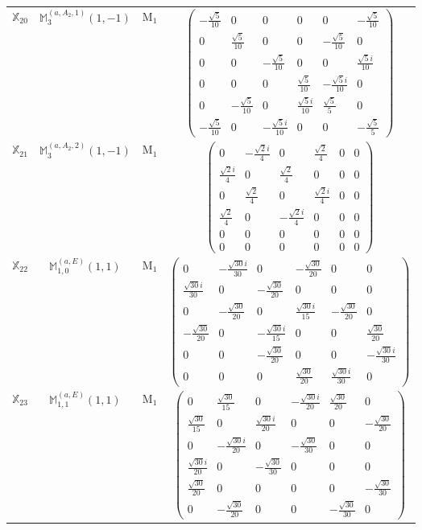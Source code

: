 \documentclass[fleqn,10pt,landscape]{article}
\begin{document}
\begin{itemize}
\begin{center}
\begin{longtable}{c|c|c|c}
$ \mathbb{X}_{20} $ & $\mathbb{M}_{3}^{(a,A_{2},1)}(1,-1)$ & M$_{1}$ & $\begin{pmatrix} - \frac{\sqrt{5}}{10} & 0 & 0 & 0 & 0 & - \frac{\sqrt{5}}{10} \\ 0 & \frac{\sqrt{5}}{10} & 0 & 0 & - \frac{\sqrt{5}}{10} & 0 \\ 0 & 0 & - \frac{\sqrt{5}}{10} & 0 & 0 & \frac{\sqrt{5} i}{10} \\ 0 & 0 & 0 & \frac{\sqrt{5}}{10} & - \frac{\sqrt{5} i}{10} & 0 \\ 0 & - \frac{\sqrt{5}}{10} & 0 & \frac{\sqrt{5} i}{10} & \frac{\sqrt{5}}{5} & 0 \\ - \frac{\sqrt{5}}{10} & 0 & - \frac{\sqrt{5} i}{10} & 0 & 0 & - \frac{\sqrt{5}}{5} \end{pmatrix}$ \\
$ \mathbb{X}_{21} $ & $\mathbb{M}_{3}^{(a,A_{2},2)}(1,-1)$ & M$_{1}$ & $\begin{pmatrix} 0 & - \frac{\sqrt{2} i}{4} & 0 & \frac{\sqrt{2}}{4} & 0 & 0 \\ \frac{\sqrt{2} i}{4} & 0 & \frac{\sqrt{2}}{4} & 0 & 0 & 0 \\ 0 & \frac{\sqrt{2}}{4} & 0 & \frac{\sqrt{2} i}{4} & 0 & 0 \\ \frac{\sqrt{2}}{4} & 0 & - \frac{\sqrt{2} i}{4} & 0 & 0 & 0 \\ 0 & 0 & 0 & 0 & 0 & 0 \\ 0 & 0 & 0 & 0 & 0 & 0 \end{pmatrix}$ \\
$ \mathbb{X}_{22} $ & $\mathbb{M}_{1,0}^{(a,E)}(1,1)$ & M$_{1}$ & $\begin{pmatrix} 0 & - \frac{\sqrt{30} i}{30} & 0 & - \frac{\sqrt{30}}{20} & 0 & 0 \\ \frac{\sqrt{30} i}{30} & 0 & - \frac{\sqrt{30}}{20} & 0 & 0 & 0 \\ 0 & - \frac{\sqrt{30}}{20} & 0 & \frac{\sqrt{30} i}{15} & - \frac{\sqrt{30}}{20} & 0 \\ - \frac{\sqrt{30}}{20} & 0 & - \frac{\sqrt{30} i}{15} & 0 & 0 & \frac{\sqrt{30}}{20} \\ 0 & 0 & - \frac{\sqrt{30}}{20} & 0 & 0 & - \frac{\sqrt{30} i}{30} \\ 0 & 0 & 0 & \frac{\sqrt{30}}{20} & \frac{\sqrt{30} i}{30} & 0 \end{pmatrix}$ \\
$ \mathbb{X}_{23} $ & $\mathbb{M}_{1,1}^{(a,E)}(1,1)$ & M$_{1}$ & $\begin{pmatrix} 0 & \frac{\sqrt{30}}{15} & 0 & - \frac{\sqrt{30} i}{20} & \frac{\sqrt{30}}{20} & 0 \\ \frac{\sqrt{30}}{15} & 0 & \frac{\sqrt{30} i}{20} & 0 & 0 & - \frac{\sqrt{30}}{20} \\ 0 & - \frac{\sqrt{30} i}{20} & 0 & - \frac{\sqrt{30}}{30} & 0 & 0 \\ \frac{\sqrt{30} i}{20} & 0 & - \frac{\sqrt{30}}{30} & 0 & 0 & 0 \\ \frac{\sqrt{30}}{20} & 0 & 0 & 0 & 0 & - \frac{\sqrt{30}}{30} \\ 0 & - \frac{\sqrt{30}}{20} & 0 & 0 & - \frac{\sqrt{30}}{30} & 0 \end{pmatrix}$ \\

\end{longtable}
\end{center}
\end{itemize}
\end{document}
